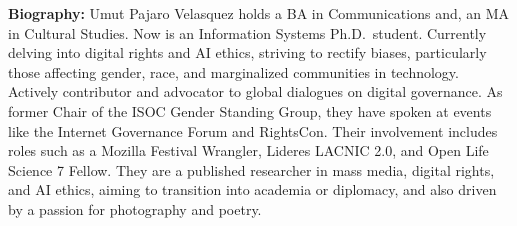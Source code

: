 \vspace{1em}

{\bfseries Biography:}
Umut Pajaro Velasquez holds a BA in Communications and, an MA in Cultural Studies. Now is an Information Systems Ph.D.~student. Currently delving into digital rights and AI ethics, striving to rectify biases, particularly those affecting gender, race, and marginalized communities in technology. Actively contributor and advocator to global dialogues on digital governance. As former Chair of the ISOC Gender Standing Group, they have spoken at events like the Internet Governance Forum and RightsCon. Their involvement includes roles such as a Mozilla Festival Wrangler, Lideres LACNIC 2.0, and Open Life Science 7 Fellow. They are a published researcher in mass media, digital rights, and AI ethics, aiming to transition into academia or diplomacy, and also driven by a passion for photography and poetry.

\newpage

